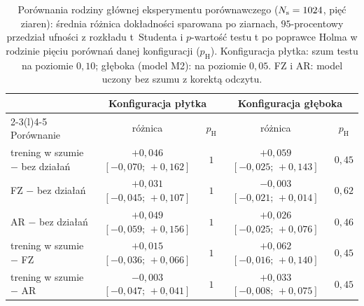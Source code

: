 \begin{table}[htb]
\centering
\caption[Porównania rodziny głównej eksperymentu porównawczego]{Porównania rodziny głównej eksperymentu porównawczego ($N_{\mathrm{s}}=1024$, pięć ziaren): średnia różnica dokładności sparowana po ziarnach, $95$-procentowy przedział ufności z rozkładu t~Studenta i $p$-wartość testu t po poprawce Holma w rodzinie pięciu porównań danej konfiguracji ($p_{\mathrm{H}}$). Konfiguracja płytka: szum testu na poziomie $0{,}10$; głęboka (model M2): na poziomie $0{,}05$. FZ i AR: model uczony bez szumu z korektą odczytu.}
\label{tab:cls:app:family}
\footnotesize
\setlength{\tabcolsep}{5pt}
\begin{tabular}{@{}lcccc@{}}
\toprule
 & \multicolumn{2}{c}{Konfiguracja płytka} & \multicolumn{2}{c}{Konfiguracja głęboka} \\
\cmidrule(lr){2-3}\cmidrule(l){4-5}
Porównanie & różnica & $p_{\mathrm{H}}$ & różnica & $p_{\mathrm{H}}$ \\
\midrule
trening w szumie $-$ bez działań & $+0{,}046$ $[-0{,}070;\,+0{,}162]$ & $1$ & $+0{,}059$ $[-0{,}025;\,+0{,}143]$ & $0{,}45$ \\
FZ $-$ bez działań & $+0{,}031$ $[-0{,}045;\,+0{,}107]$ & $1$ & $-0{,}003$ $[-0{,}021;\,+0{,}014]$ & $0{,}62$ \\
AR $-$ bez działań & $+0{,}049$ $[-0{,}059;\,+0{,}156]$ & $1$ & $+0{,}026$ $[-0{,}025;\,+0{,}076]$ & $0{,}46$ \\
trening w szumie $-$ FZ & $+0{,}015$ $[-0{,}036;\,+0{,}066]$ & $1$ & $+0{,}062$ $[-0{,}016;\,+0{,}140]$ & $0{,}45$ \\
trening w szumie $-$ AR & $-0{,}003$ $[-0{,}047;\,+0{,}041]$ & $1$ & $+0{,}033$ $[-0{,}008;\,+0{,}075]$ & $0{,}45$ \\
\bottomrule
\end{tabular}
\end{table}
